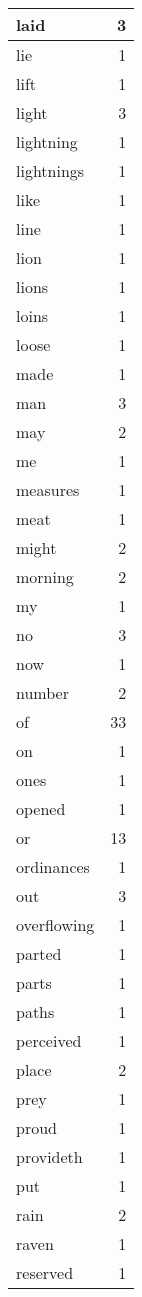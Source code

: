 \begin{center}
\begin{longtable}{l|r}
laid & 3 \\ \hline
lie & 1 \\ \hline
lift & 1 \\ \hline
light & 3 \\ \hline
lightning & 1 \\ \hline
lightnings & 1 \\ \hline
like & 1 \\ \hline
line & 1 \\ \hline
lion & 1 \\ \hline
lions & 1 \\ \hline
loins & 1 \\ \hline
loose & 1 \\ \hline
made & 1 \\ \hline
man & 3 \\ \hline
may & 2 \\ \hline
me & 1 \\ \hline
measures & 1 \\ \hline
meat & 1 \\ \hline
might & 2 \\ \hline
morning & 2 \\ \hline
my & 1 \\ \hline
no & 3 \\ \hline
now & 1 \\ \hline
number & 2 \\ \hline
of & 33 \\ \hline
on & 1 \\ \hline
ones & 1 \\ \hline
opened & 1 \\ \hline
or & 13 \\ \hline
ordinances & 1 \\ \hline
out & 3 \\ \hline
overflowing & 1 \\ \hline
parted & 1 \\ \hline
parts & 1 \\ \hline
paths & 1 \\ \hline
perceived & 1 \\ \hline
place & 2 \\ \hline
prey & 1 \\ \hline
proud & 1 \\ \hline
provideth & 1 \\ \hline
put & 1 \\ \hline
rain & 2 \\ \hline
raven & 1 \\ \hline
reserved & 1 \\ \hline

\end{longtable}
\end{center}
